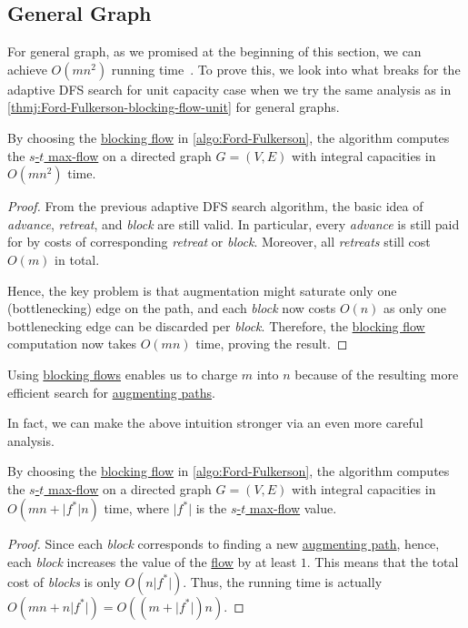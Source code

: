 \subsection{General Graph}
For general graph, as we promised at the beginning of this section, we can achieve \(O(mn^2)\) running time~\cite{karzanov1973finding,dinic1970algorithm,goldberg1998beyond}. To prove this, we look into what breaks for the adaptive DFS search for unit capacity case when we try the same analysis as in \autoref{thmj:Ford-Fulkerson-blocking-flow-unit} for general graphs.

\begin{theorem}\label{thm:Ford-Fulkerson-blocking-flow-general}
	By choosing the \hyperref[def:blocking-flow]{blocking flow} in \autoref{algo:Ford-Fulkerson}, the algorithm computes the \hyperref[prb:s-t-max-flow]{\(s\)-\(t\) max-flow} on a directed graph \(G = (V, E)\) with integral capacities in \(O(mn^2)\) time.
\end{theorem}
\begin{proof}
	From the previous adaptive DFS search algorithm, the basic idea of \emph{advance}, \emph{retreat}, and \emph{block} are still valid. In particular, every \emph{advance} is still paid for by costs of corresponding \emph{retreat} or \emph{block}. Moreover, all \emph{retreats} still cost \(O(m)\) in total.

	Hence, the key problem is that augmentation might saturate only one (bottlenecking) edge on the path, and each \emph{block} now costs \(O(n)\) as only one bottlenecking edge can be discarded per \emph{block}. Therefore, the \hyperref[def:blocking-flow]{blocking flow} computation now takes \(O(mn)\) time, proving the result.
\end{proof}

\begin{intuition}
	Using \hyperref[def:blocking-flow]{blocking flows} enables us to charge \(m\) into \(n\) because of the resulting more efficient search for \hyperref[def:augmenting-path]{augmenting paths}.
\end{intuition}

In fact, we can make the above intuition stronger via an even more careful analysis.

\begin{corollary}\label{col:Ford-Fulkerson-blocking-flow-general}
	By choosing the \hyperref[def:blocking-flow]{blocking flow} in \autoref{algo:Ford-Fulkerson}, the algorithm computes the \hyperref[prb:s-t-max-flow]{\(s\)-\(t\) max-flow} on a directed graph \(G = (V, E)\) with integral capacities in \(O(mn + \lvert f^{\ast} \rvert n)\) time, where \(\lvert f^{\ast} \rvert \) is the \hyperref[prb:s-t-max-flow]{\(s\)-\(t\) max-flow} value.
\end{corollary}
\begin{proof}
	Since each \emph{block} corresponds to finding a new \hyperref[def:augmenting-path]{augmenting path}, hence, each \emph{block} increases the value of the \hyperref[def:flow]{flow} by at least \(1\). This means that the total cost of \emph{blocks} is only \(O(n \lvert f^{\ast} \rvert )\). Thus, the running time is actually \(O(mn + n \lvert f^{\ast} \rvert ) = O((m + \lvert f^{\ast} \rvert) n)\).
\end{proof}

